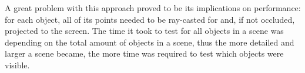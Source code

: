 A great problem with this approach proved to be its implications on performance: for each object, all of its points needed to be ray-casted for and, if not occluded, projected to the screen. The time it took to test for all objects in a scene was depending on the total amount of objects in a scene, thus the more detailed and larger a scene became, the more time was required to test which objects were visible.\\
\begin{figure}[htp]
    \sbox{}
\end{figure}
